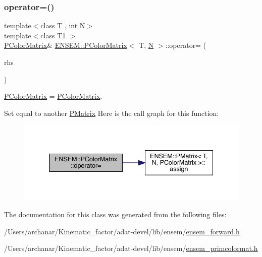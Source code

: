 \subsubsection{\texorpdfstring{operator=()}{operator=()}\hspace{0.1cm}{\footnotesize\ttfamily [6/6]}}
{\footnotesize\ttfamily template$<$class T , int N$>$ \\
template$<$class T1 $>$ \\
\mbox{\hyperlink{classENSEM_1_1PColorMatrix}{P\+Color\+Matrix}}\& \mbox{\hyperlink{classENSEM_1_1PColorMatrix}{E\+N\+S\+E\+M\+::\+P\+Color\+Matrix}}$<$ T, \mbox{\hyperlink{adat__devel_2lib_2hadron_2operator__name__util_8cc_a7722c8ecbb62d99aee7ce68b1752f337}{N}} $>$\+::operator= (\begin{DoxyParamCaption}\item[{const \mbox{\hyperlink{classENSEM_1_1PColorMatrix}{P\+Color\+Matrix}}$<$ T1, \mbox{\hyperlink{adat__devel_2lib_2hadron_2operator__name__util_8cc_a7722c8ecbb62d99aee7ce68b1752f337}{N}} $>$ \&}]{rhs }\end{DoxyParamCaption})\hspace{0.3cm}{\ttfamily [inline]}}



\mbox{\hyperlink{classENSEM_1_1PColorMatrix}{P\+Color\+Matrix}} = \mbox{\hyperlink{classENSEM_1_1PColorMatrix}{P\+Color\+Matrix}}. 

Set equal to another \mbox{\hyperlink{classENSEM_1_1PMatrix}{P\+Matrix}} Here is the call graph for this function\+:
\nopagebreak
\begin{figure}[H]
\begin{center}
\leavevmode
\includegraphics[width=338pt]{d8/d21/classENSEM_1_1PColorMatrix_a529b6a2c63f2087a6a336af14b6f80eb_cgraph}
\end{center}
\end{figure}


The documentation for this class was generated from the following files\+:\begin{DoxyCompactItemize}
\item 
/\+Users/archanar/\+Kinematic\+\_\+factor/adat-\/devel/lib/ensem/\mbox{\hyperlink{adat-devel_2lib_2ensem_2ensem__forward_8h}{ensem\+\_\+forward.\+h}}\item 
/\+Users/archanar/\+Kinematic\+\_\+factor/adat-\/devel/lib/ensem/\mbox{\hyperlink{adat-devel_2lib_2ensem_2ensem__primcolormat_8h}{ensem\+\_\+primcolormat.\+h}}\end{DoxyCompactItemize}
